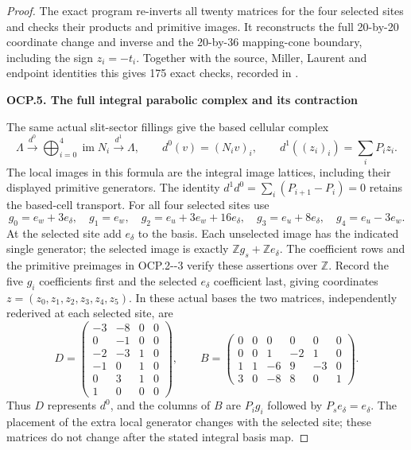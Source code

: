 \begin{proof}
The exact program
re-inverts all twenty matrices for the four selected sites
and checks their products and primitive images.
It reconstructs the full 20-by-20 coordinate change and
inverse and the 20-by-36 mapping-cone boundary, including
the sign \(z_i=-t_i\). Together with the source, Miller,
Laurent and endpoint identities this gives 175 exact
checks, recorded in
.

\par

\medskip\noindent\textbf{OCP.5. The full integral parabolic complex and its contraction}

\par\nobreak

The same actual slit-sector fillings give the based cellular complex
\[
\Lambda\xrightarrow{d^0}\bigoplus_{i=0}^4\operatorname{im}N_i
\xrightarrow{d^1}\Lambda,
\qquad d^0(v)=(N_i v)_i,\qquad
d^1((z_i)_i)=\sum_iP_i z_i.
\tag{OCP.15}
\]
The local images in this formula are the integral image lattices,
including their displayed primitive generators. The identity
\(d^1d^0=\sum_i(P_{i+1}-P_i)=0\) retains the based-cell transport.
For all four selected sites use
\[
g_0=e_w+3e_\delta,\quad g_1=e_w,\quad
g_2=e_u+3e_w+16e_\delta,\quad
g_3=e_u+8e_\delta,\quad g_4=e_u-3e_w.
\tag{OCP.16}
\]
At the selected site add \(e_\delta\) to the basis. Each unselected
image has the indicated single generator; the selected image is
exactly \(\mathbb Zg_s+\mathbb Ze_\delta\). The coefficient rows
and the primitive preimages in OCP.2-\/-3 verify these assertions over
\(\mathbb Z\). Record the five \(g_i\) coefficients first and the
selected \(e_\delta\) coefficient last, giving coordinates
\(z=(z_0,z_1,z_2,z_3,z_4,z_5)\). In these actual bases the two
matrices, independently rederived at each selected site, are
\[
D=\begin{pmatrix}
-3&-8&0&0\\
0&-1&0&0\\
-2&-3&1&0\\
-1&0&1&0\\
0&3&1&0\\
1&0&0&0
\end{pmatrix},\qquad
B=\begin{pmatrix}
0&0&0&0&0&0\\
0&0&1&-2&1&0\\
1&1&-6&9&-3&0\\
3&0&-8&8&0&1
\end{pmatrix}.
\tag{OCP.17}
\]
Thus \(D\) represents \(d^0\), and the columns of \(B\) are
\(P_i g_i\) followed by \(P_s e_\delta=e_\delta\).
The placement of the extra local generator changes with the selected
site; these matrices do not change after the stated integral basis map.


\end{proof}
